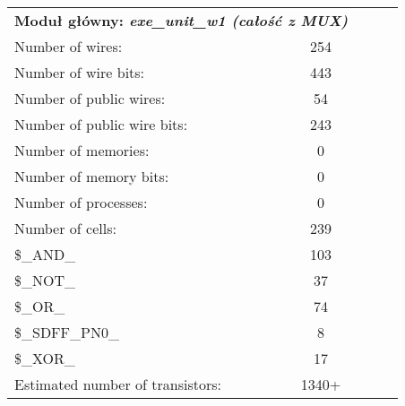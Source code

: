 \begin{table}[h!]
	\centering
	\begin{tabular}{lllll}
		\cline{1-2}
		\multicolumn{2}{|c|}{\textbf{Moduł główny: \emph{exe\_unit\_w1 (całość z MUX)}}} &  &  &  \\ \cline{1-2}
		\multicolumn{1}{|l|}{Number of wires:} & \multicolumn{1}{c|}{254} &  &  &  \\ \cline{1-2}
		\multicolumn{1}{|l|}{Number of wire bits:} & \multicolumn{1}{c|}{443} &  &  &  \\ \cline{1-2}
		\multicolumn{1}{|l|}{Number of public wires:} & \multicolumn{1}{c|}{54} &  &  &  \\ \cline{1-2}
		\multicolumn{1}{|l|}{Number of public wire bits:} & \multicolumn{1}{c|}{243} &  &  &  \\ \cline{1-2}
		\multicolumn{1}{|l|}{Number of memories:} & \multicolumn{1}{c|}{0} &  &  &  \\ \cline{1-2}
		\multicolumn{1}{|l|}{Number of memory bits: } & \multicolumn{1}{c|}{0} &  &  &  \\ \cline{1-2}
		\multicolumn{1}{|l|}{Number of processes: } & \multicolumn{1}{c|}{0} &  &  &  \\ \cline{1-2}
		\multicolumn{1}{|l|}{Number of cells:} & \multicolumn{1}{c|}{239} &  &  &  \\ \cline{1-2}
		\multicolumn{1}{|l|}{\$\_AND\_} & \multicolumn{1}{c|}{103} &  &  &  \\ \cline{1-2}
		\multicolumn{1}{|l|}{\$\_NOT\_} & \multicolumn{1}{c|}{37} &  &  &  \\ \cline{1-2}
		\multicolumn{1}{|l|}{\$\_OR\_} & \multicolumn{1}{c|}{74} &  &  &  \\ \cline{1-2}
		\multicolumn{1}{|l|}{\$\_SDFF\_PN0\_} & \multicolumn{1}{c|}{8} &  &  &  \\ \cline{1-2}
		\multicolumn{1}{|l|}{\$\_XOR\_} & \multicolumn{1}{c|}{17} &  &  &  \\ \cline{1-2}
		\multicolumn{1}{|l|}{Estimated number of transistors:} & \multicolumn{1}{c|}{1340+} &  &  &  \\ \cline{1-2}

	\end{tabular}
\end{table}